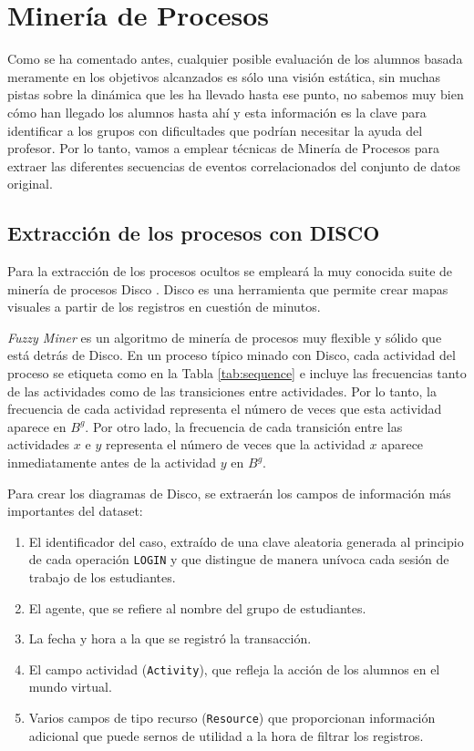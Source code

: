 \chapter{Minería de Procesos}\label{sec:chapterIII}

Como se ha comentado antes, cualquier posible evaluación de los alumnos basada meramente en los objetivos alcanzados es sólo una visión estática, sin muchas pistas sobre la dinámica que les ha llevado hasta ese punto, no sabemos muy bien cómo han llegado los alumnos hasta ahí y esta información es la clave para identificar a los grupos con dificultades que podrían necesitar la ayuda del profesor. Por lo tanto, vamos a emplear técnicas de Minería de Procesos \cite{aalst2016} para extraer las diferentes secuencias de eventos correlacionados del conjunto de datos original.

\section{Extracción de los procesos con DISCO}

Para la extracción de los procesos ocultos se empleará la muy conocida suite de minería de procesos Disco \cite{gunther2012disco}. Disco es una herramienta que permite crear mapas visuales a partir de los registros en cuestión de minutos.

\emph{Fuzzy Miner} \cite{gunther2007fuzzy} es un algoritmo de minería de procesos muy flexible y sólido que está detrás de Disco. En un proceso típico minado con Disco, cada actividad del proceso se etiqueta como en la Tabla \ref{tab:sequence} e incluye las frecuencias tanto de las actividades como de las transiciones entre actividades. Por lo tanto, la frecuencia de cada actividad representa el número de veces que esta actividad aparece en $B^g$. Por otro lado, la frecuencia de cada transición entre las actividades $x$ e $y$ representa el número de veces que la actividad $x$ aparece inmediatamente antes de la actividad $y$ en $B^g$.

Para crear los diagramas de Disco, se extraerán los campos de información más importantes del dataset:
\begin{enumerate}
\item El identificador del caso, extraído de una clave aleatoria generada al principio de cada operación \texttt{LOGIN} y que distingue de manera unívoca cada sesión de trabajo de los estudiantes.
\item El agente, que se refiere al nombre del grupo de estudiantes.
\item La fecha y hora a la que se registró la transacción.
\item El campo actividad (\texttt{Activity}), que refleja la acción de los alumnos en el mundo virtual.
\item Varios campos de tipo recurso (\texttt{Resource}) que proporcionan información adicional que puede sernos de utilidad a la hora de filtrar los registros.
\end{enumerate}

